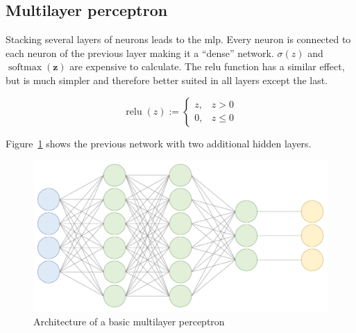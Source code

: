 \subsection{Multilayer perceptron}
Stacking several layers of neurons leads to the \gls{mlp}. Every neuron is connected to each neuron of the previous layer making it a ``dense'' network.
$\sigma(z)$ and $\operatorname{softmax}(\mathbf{z})$ are expensive to calculate. The \gls{relu} function has a similar effect, but is much simpler and therefore better suited in all layers except the last.

\begin{equation}
\operatorname{relu}(z) := \begin{cases}z,&z>0\\0,&z\leq 0\end{cases}
\end{equation}

Figure~\ref{fig:mlp_architecture} shows the previous network with two additional hidden layers.

\begin{figure}[H]
    \begin{center}
    \includegraphics[width=15cm]{../images/mlp_architecture.png}
    \caption{Architecture of a basic multilayer perceptron}\label{fig:mlp_architecture}
    \end{center}
\end{figure}


